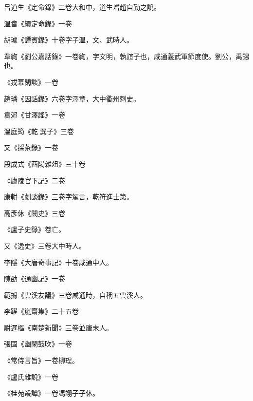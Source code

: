 \begin{pinyinscope}
 呂道生《定命錄》二卷大和中，道生增趙自勤之說。



 溫畬《續定命錄》一卷



 胡璩《譚賓錄》十卷字子溫，文、武時人。



 韋絢《劉公嘉話錄》一卷絢，字文明，執誼子也，咸通義武軍節度使。劉公，禹錫也。



 《戎幕閑談》一卷



 趙璘《因話錄》六卷字澤章，大中衢州刺史。



 袁郊《甘澤謠》一卷



 溫庭筠《乾巽子》三卷



 又《採茶錄》一卷



 段成式《酉陽雜俎》三十卷



 《廬陵官下記》二卷



 康軿《劇談錄》三卷字駕言，乾符進士第。



 高彥休《闕史》三卷



 《盧子史錄》卷亡。



 又《逸史》三卷大中時人。



 李隱《大唐奇事記》十卷咸通中人。



 陳劭《通幽記》一卷



 範攄《雲溪友議》三卷咸通時，自稱五雲溪人。



 李躍《嵐齋集》二十五卷



 尉遲樞《南楚新聞》三卷並唐末人。



 張固《幽閑鼓吹》一卷



 《常侍言旨》一卷柳珵。



 《盧氏雜說》一卷



 《桂苑叢譚》一卷馮翊子子休。




\end{pinyinscope}
